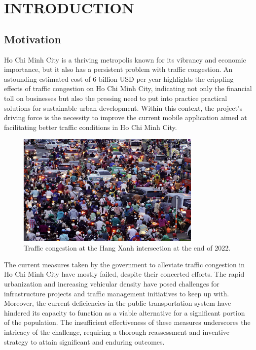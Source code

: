 %
%
\section{INTRODUCTION}

\subsection{Motivation}

Ho Chi Minh City is a thriving metropolis known for its vibrancy and economic importance, but it also has a persistent problem with traffic congestion. An astounding estimated cost of 6 billion USD per year \cite{congestion-damage} highlights the crippling effects of traffic congestion on Ho Chi Minh City, indicating not only the financial toll on businesses but also the pressing need to put into practice practical solutions for sustainable urban development. Within this context, the project's driving force is the necessity to improve the current mobile application aimed at facilitating better traffic conditions in Ho Chi Minh City. \cite{utraffic-mobile}

\begin{figure}[H]
    \centering
    \includegraphics[width=0.8\textwidth]{assets/images/Trivia/Ket_xe.jpg}
    \caption{Traffic congestion at the Hang Xanh intersection at the end of 2022.}
    \label{fig:ket_xe}
\end{figure}

The current measures taken by the government to alleviate traffic congestion in Ho Chi Minh City have mostly failed, despite their concerted efforts. The rapid urbanization and increasing vehicular density have posed challenges for infrastructure projects and traffic management initiatives to keep up with. Moreover, the current deficiencies in the public transportation system have hindered its capacity to function as a viable alternative for a significant portion of the population. The insufficient effectiveness of these measures underscores the intricacy of the challenge, requiring a thorough reassessment and inventive strategy to attain significant and enduring outcomes.

